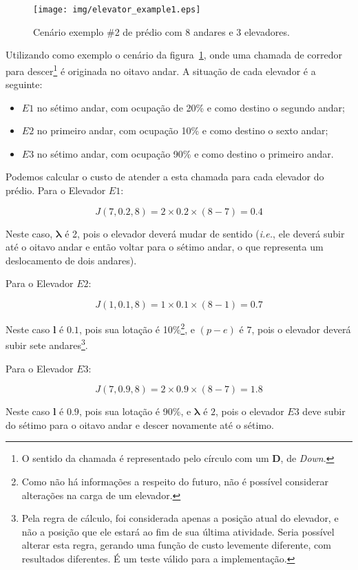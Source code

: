 \begin{figure}[htb!]
  \centering
  \texttt{[image: img/elevator\_example1.eps]}
  \caption{Cenário exemplo \#2 de prédio com 8 andares e 3 elevadores.}
  \label{fig:elevadores-1}
\end{figure}

Utilizando como exemplo o cenário da figura~\ref{fig:elevadores-1}, onde uma
chamada de corredor para descer\footnote{O sentido da chamada é representado
pelo círculo com um \textbf{D}, de \textit{Down}.} é originada no oitavo andar.
A situação de cada elevador é a seguinte:

\begin{itemize}
\item $E1$ no sétimo andar, com ocupação de 20\% e como destino o segundo andar;
\item $E2$ no primeiro andar, com ocupação 10\% e como destino o sexto andar;
\item $E3$ no sétimo andar, com ocupação 90\% e como destino o primeiro andar.
\end{itemize}

Podemos calcular o custo de atender a esta chamada para cada elevador do prédio.
Para o Elevador $E1$:

\[J(7, 0.2, 8) = 2 \times 0.2 \times (8 - 7) = 0.4\]

Neste caso, $\boldsymbol{\lambda}$ é 2, pois o elevador deverá mudar de sentido
(\textit{i.e.}, ele deverá subir até o oitavo andar e então voltar para o sétimo
andar, o que representa um deslocamento de dois andares).

Para o Elevador $E2$:

\[J(1, 0.1, 8) = 1 \times 0.1 \times (8 - 1) = 0.7\]

Neste caso $\boldsymbol{l}$ é $0.1$, pois sua lotação é 10\%\footnote{Como não
há informações a respeito do futuro, não é possível considerar alterações na
carga de um elevador.}, e $(p - e)$ é $7$, pois o elevador deverá subir sete
andares\footnote{Pela regra de cálculo, foi considerada apenas a posição atual
do elevador, e não a posição que ele estará ao fim de sua última atividade.
Seria possível alterar esta regra, gerando uma função de custo levemente
diferente, com resultados diferentes. É um teste válido para a implementação.}.

Para o Elevador $E3$:

\[J(7, 0.9, 8) = 2 \times 0.9\times (8 - 7) = 1.8\]

Neste caso $\boldsymbol{l}$ é $0.9$, pois sua lotação é 90\%, e
$\boldsymbol{\lambda}$ é $2$, pois o elevador $E3$ deve subir do sétimo para o
oitavo andar e descer novamente até o sétimo.

